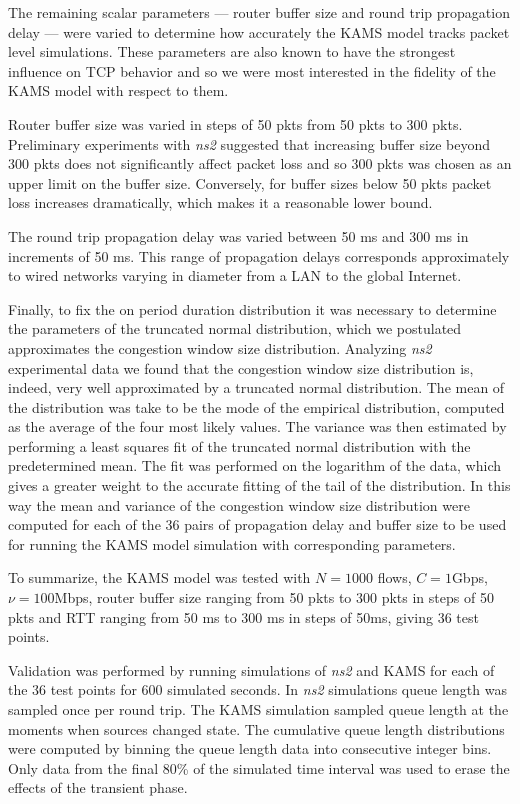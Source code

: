 \documentclass{IEEEtran}[10pt,letterpaper,conference]
\begin{document}
The remaining scalar parameters --- router buffer size and round trip propagation delay --- were varied to determine how accurately the KAMS model tracks packet level simulations. These parameters are also known to have the strongest influence on TCP behavior and so we were most interested in the fidelity of the KAMS model with respect to them.

Router buffer size was varied in steps of 50 pkts from 50 pkts to 300 pkts. Preliminary experiments with \emph{ns2} suggested that increasing buffer size beyond 300 pkts does not significantly affect packet loss and so 300 pkts was chosen as an upper limit on the buffer size. Conversely, for buffer sizes below 50 pkts packet loss increases dramatically, which makes it a reasonable lower bound.

The round trip propagation delay was varied between 50 ms and 300 ms in increments of 50 ms. This range of propagation delays corresponds approximately to wired networks varying in diameter from a LAN to the global Internet.

Finally, to fix the on period duration distribution it was necessary to determine the parameters of the truncated normal distribution, which we postulated approximates the congestion window size distribution. Analyzing \emph{ns2} experimental data we found that the congestion window size distribution is, indeed, very well approximated by a truncated normal distribution. The mean of the distribution was take to be the mode of the empirical distribution, computed as the average of the four most likely values. The variance was then estimated by performing a least squares fit of the truncated normal distribution with the predetermined mean. The fit was performed on the logarithm of the data, which gives a greater weight to the accurate fitting of the tail of the distribution. In this way the mean and variance of the congestion window size distribution were computed for each of the 36 pairs of propagation delay and buffer size to be used for running the KAMS model simulation with corresponding parameters.

To summarize, the KAMS model was tested with $N=1000$ flows, $C=1$Gbps, $\nu=100$Mbps, router buffer size ranging from 50 pkts to 300 pkts in steps of 50 pkts and RTT ranging from 50 ms to 300 ms in steps of 50ms, giving 36 test points.

Validation was performed by running simulations of \emph{ns2} and KAMS for each of the 36 test points for 600 simulated seconds. In \emph{ns2} simulations queue length was sampled once per round trip. The KAMS simulation sampled queue length at the moments when sources changed state. The cumulative queue length distributions were computed by binning the queue length data into consecutive integer bins. Only data from the final 80\% of the simulated time interval was used to erase the effects of the transient phase.
\end{document}
